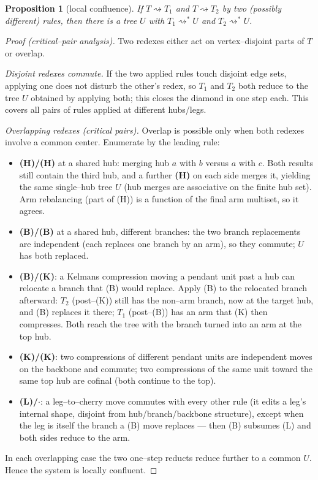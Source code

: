 \documentclass[11pt]{article}
\newtheorem{proposition}[theorem]{Proposition}
\begin{document}
\begin{proposition}[local confluence]\label{prop:localconf}
If $T\rightsquigarrow T_1$ and $T\rightsquigarrow T_2$ by two (possibly different) rules, then there is a tree
$U$ with $T_1\rightsquigarrow^\ast U$ and $T_2\rightsquigarrow^\ast U$.
\end{proposition}

\begin{proof}[Proof (critical--pair analysis)]
Two redexes either act on vertex--disjoint parts of $T$ or overlap.

\emph{Disjoint redexes commute.} If the two applied rules touch disjoint edge sets, applying one does not
disturb the other's redex, so $T_1$ and $T_2$ both reduce to the tree $U$ obtained by applying both; this
closes the diamond in one step each. This covers all pairs of rules applied at different hubs/legs.

\emph{Overlapping redexes (critical pairs).} Overlap is possible only when both redexes involve a common
center. Enumerate by the leading rule:
\begin{itemize}
\item \textbf{(H)/(H)} at a shared hub: merging hub $a$ with $b$ versus $a$ with $c$. Both results still
contain the third hub, and a further \textbf{(H)} on each side merges it, yielding the same single--hub tree
$U$ (hub merges are associative on the finite hub set). Arm rebalancing (part of (H)) is a function of the
final arm multiset, so it agrees.
\item \textbf{(B)/(B)} at a shared hub, different branches: the two branch replacements are independent (each
replaces one branch by an arm), so they commute; $U$ has both replaced.
\item \textbf{(B)/(K)}: a Kelmans compression moving a pendant unit past a hub can relocate a branch that (B)
would replace. Apply (B) to the relocated branch afterward: $T_2$ (post--(K)) still has the non--arm branch,
now at the target hub, and (B) replaces it there; $T_1$ (post--(B)) has an arm that (K) then compresses. Both
reach the tree with the branch turned into an arm at the top hub.
\item \textbf{(K)/(K)}: two compressions of different pendant units are independent moves on the backbone and
commute; two compressions of the same unit toward the same top hub are cofinal (both continue to the top).
\item \textbf{(L)/$\cdot$}: a leg--to--cherry move commutes with every other rule (it edits a leg's internal
shape, disjoint from hub/branch/backbone structure), except when the leg is itself the branch a (B) move
replaces --- then (B) subsumes (L) and both sides reduce to the arm.
\end{itemize}
In each overlapping case the two one--step reducts reduce further to a common $U$. Hence the system is locally
confluent.
\end{proof}
\end{document}
